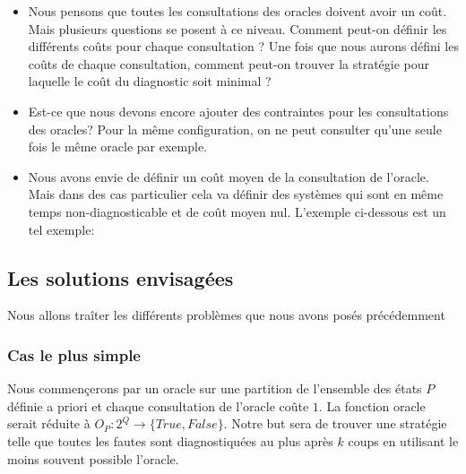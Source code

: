 \documentclass[a4paper,10pt]{article}
\begin{document}
\begin{itemize}
\item Nous pensons que toutes les consultations des oracles doivent avoir un co\^ut. Mais plusieurs questions se posent \`a ce niveau. Comment peut-on d\'efinir les diff\'erents co\^uts pour chaque consultation ? Une fois que nous aurons d\'efini les co\^uts de chaque consultation, comment peut-on trouver la strat\'egie pour laquelle le co\^ut du diagnostic soit minimal ?

\item Est-ce que nous devons encore ajouter des contraintes pour les consultations des oracles? Pour la m\^eme configuration, on ne peut consulter qu'une seule fois le m\^eme oracle par exemple.

\item Nous avons envie de d\'efinir un co\^ut moyen de la consultation de l'oracle. Mais dans des cas particulier cela va d\'efinir des syst\`emes qui sont en m\^eme temps non-diagnosticable et de co\^ut moyen nul. L'exemple ci-dessous est un tel exemple:

\begin{figure}[H]
  \begin{center}
  \end{center}
\end{figure}

  
\end{itemize}


\subsection{Les solutions envisag\'ees}

Nous allons tra\^iter les diff\'erents probl\`emes que nous avons pos\'es pr\'ec\'edemment

\subsubsection{Cas le plus simple}

Nous commen\c cerons par un oracle sur une partition de l'ensemble des états $P$ d\'efinie a priori et chaque consultation de l'oracle co\^ute $1$. La fonction oracle serait r\'eduite \`a $O_P : 2^Q \to \{True, False\}$. Notre but sera de trouver une strat\'egie telle que toutes les fautes sont diagnostiqu\'ees au plus apr\`es $k$ coups en utilisant le moins souvent possible l'oracle.
\end{document}
